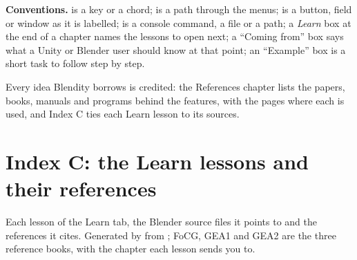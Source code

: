 \documentclass[11pt, twoside, openany]{book}
\begin{document}
\textbf{Conventions.}  is a key or a chord;  is a path through the menus;
 is a button, field or window as it is labelled;  is a console command, a file
or a path; a \emph{Learn} box at the end of a chapter names the lessons to open next; a ``Coming from'' box says what a
Unity or Blender user should know at that point; an ``Example'' box is a short task to follow step by step.

Every idea Blendity borrows is credited: the References chapter lists the papers, books, manuals and programs behind
the features, with the pages where each is used, and Index C ties each Learn lesson to its sources.

\tableofcontents
\listoffigures

\mainmatter














\backmatter

\chapter{Index C: the Learn lessons and their references}
\label{ch:indexC}
Each lesson of the Learn tab, the Blender source files it points to and the references it cites. Generated by
 from ; FoCG, GEA1 and GEA2 are the three reference books,
with the chapter each lesson sends you to.


\end{document}
